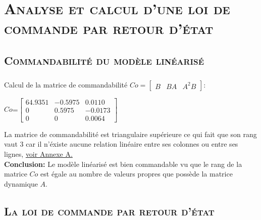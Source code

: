  \chapter{\textsc {Analyse et calcul d'une loi de commande par retour d'état} }
 
	\section{\textsc {Commandabilité du modèle linéarisé}} 
 	
 	\paragraph{}
 		Calcul de la matrice de commandabilité $Co=\begin{bmatrix} B&BA&A^{2}B \end{bmatrix} $:
 		
 		\begin{center}
			
			$Co$=$\begin{bmatrix}
			64.9351&-0.5975&0.0110\\
			0&0.5975&-0.0173\\
			0&0&0.0064
			\end{bmatrix}$	
			 			
		\end{center} 		 
		
		La matrice de commandabilité est triangulaire supérieure ce qui fait que son rang vaut 3 car il n'éxiste aucune relation linéaire entre ses colonnes ou entre ses lignes,\label{Co} \hyperref[Annexe A]{voir Annexe A.}\\
		
		\textbf{Conclusion:} Le modèle linéarisé est bien commandable vu que le rang de la matrice $Co$ est égale au nombre de valeurs propres que possède la matrice dynamique $A$. 
		
		\section{\textsc {La loi de commande par retour d'état}} 
		
		\begin{center}
		\label{fig1}
		\end{center}
		
